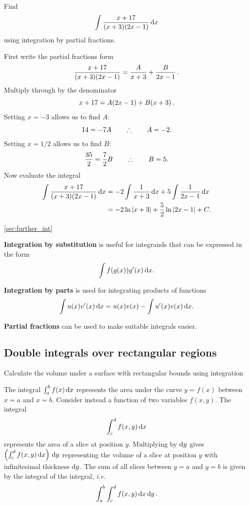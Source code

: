 \begin{example}[Video]
Find
\[
\int\frac{x+17}{(x+3)(2x-1)}\,{\rm d}x
\]
using integration by partial fractions.
\end{example}

\begin{solution}
First write the partial fractions form
\[
\frac{x+17}{(x+3)(2x-1)}=\frac{A}{x+3}+\frac{B}{2x-1}\, .
\]
Multiply through by the denominator
\[
x+17=A(2x-1)+B(x+3)\, .
\]
Setting $x=-3$ allows us to find $A$:
\[
14=-7A \qquad\therefore\qquad A=-2.
\]
Setting $x=1/2$ allows us to find $B$:
\[
\frac{35}{2}=\frac{7}{2}B \qquad\therefore\qquad B=5.
\]
Now evaluate the integral
\begin{align*}
    \int\frac{x+17}{(x+3)(2x-1)}\,{\rm d}x
    &=-2\int\frac{1}{x+3}\,{\rm d}x+5\int\frac{1}{2x-1}\,{\rm d}x\\
    &= -2\ln|x+3|+\frac{5}{2}\ln|2x-1|+C.
\end{align*}
\end{solution}

\begin{recap}{\ref{sec:further_int}}
\item \textbf{Integration by substitution} is useful for integrands that can be expressed in the form
\[
\int f(g(x))g'(x)\,{\rm d}x.
\]
\item \textbf{Integration by parts} is used for integrating products of functions
\[
\int u(x)v'(x)\,{\rm d}x=u(x)v(x)-\int u'(x)v(x)\,{\rm d}x.
\]
\item \textbf{Partial fractions} can be used to make suitable integrals easier.
\end{recap}

\subsection{Double integrals over rectangular regions}
\label{sec:double_int}

\begin{learningoutcomes}
\item Calculate the volume under a surface with rectangular bounds using integration
\end{learningoutcomes}

The integral $\int_a^b f(x)\,{\rm d}x$ represents the area under the curve $y=f(x)$ between $x=a$ and $x=b$. Consider instead a function of two variables $f(x,y)$. The integral
\[
\int_c^d f(x,y)\,{\rm d}x
\]
represents the area of a slice at position $y$. Multiplying by ${\rm d}y$ gives $\left(\int_c^d f(x,y) \,{\rm d}x\right) \,{\rm d}y$ representing the volume of a slice at position $y$ with infinitesimal thickness ${\rm d}y$. The sum of all slices between $y=a$ and $y=b$ is given by the integral of the integral, \emph{i.e.}
\begin{equation}
    \label{eq:doubleint} \int_a^b\int_c^d f(x,y)\,{\rm d}x\,{\rm d}y \, .
\end{equation}

